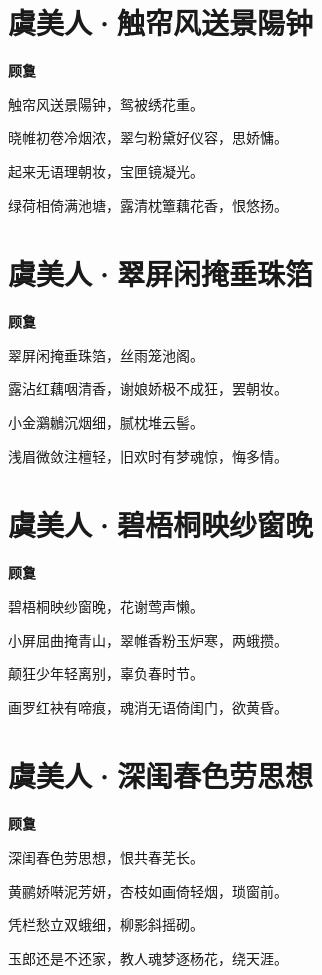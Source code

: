 \documentclass[12pt,a4paper]{ctexbook}
\begin{document}
\section{虞美人·触帘风送景陽钟}
\textbf{顾敻}\par\vspace{0.5em}
触帘风送景陽钟，鸳被绣花重。\par
晓帷初卷冷烟浓，翠匀粉黛好仪容，思娇慵。\par
起来无语理朝妆，宝匣镜凝光。\par
绿荷相倚满池塘，露清枕簟藕花香，恨悠扬。\par

\section{虞美人·翠屏闲掩垂珠箔}
\textbf{顾敻}\par\vspace{0.5em}
翠屏闲掩垂珠箔，丝雨笼池阁。\par
露沾红藕咽清香，谢娘娇极不成狂，罢朝妆。\par
小金鸂鶒沉烟细，腻枕堆云髻。\par
浅眉微敛注檀轻，旧欢时有梦魂惊，悔多情。\par

\section{虞美人·碧梧桐映纱窗晚}
\textbf{顾敻}\par\vspace{0.5em}
碧梧桐映纱窗晚，花谢莺声懒。\par
小屏屈曲掩青山，翠帷香粉玉炉寒，两蛾攒。\par
颠狂少年轻离别，辜负春时节。\par
画罗红袂有啼痕，魂消无语倚闺门，欲黄昏。\par

\section{虞美人·深闺春色劳思想}
\textbf{顾敻}\par\vspace{0.5em}
深闺春色劳思想，恨共春芜长。\par
黄鹂娇啭泥芳妍，杏枝如画倚轻烟，琐窗前。\par
凭栏愁立双蛾细，柳影斜摇砌。\par
玉郎还是不还家，教人魂梦逐杨花，绕天涯。\par
\end{document}
